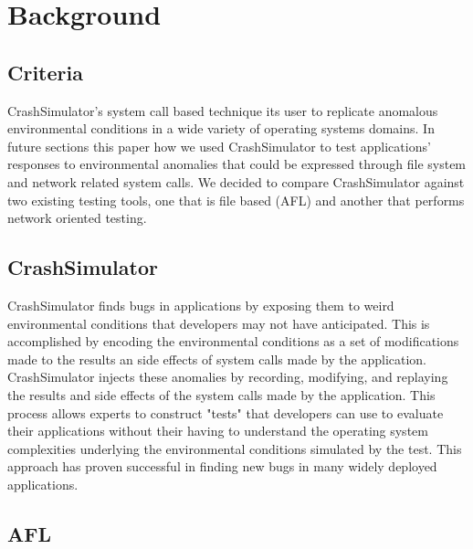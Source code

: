\section{Background}
\label{SEC:background}

\subsection{Criteria}

 CrashSimulator's system call based
technique its user to replicate anomalous environmental conditions in a
wide variety of operating systems domains.  In future sections this paper
how we used CrashSimulator to test applications' responses to environmental
anomalies that could be expressed through file system and network related
system calls.  We decided to compare CrashSimulator against two existing
testing tools, one that is file based (AFL) and another that performs
network oriented testing.

\subsection{CrashSimulator}

CrashSimulator finds bugs in applications by exposing them to weird
environmental conditions that developers may not have anticipated.  This is
accomplished by encoding the environmental conditions as a set of
modifications made to the results an side effects of system calls made by
the application.  CrashSimulator injects these anomalies by recording,
modifying, and replaying the results and side effects of the system calls
made by the application.  This process allows experts to construct "tests"
that developers can use to evaluate their applications without their having
to understand the operating system complexities underlying the
environmental conditions simulated by the test. This approach has proven
successful in finding new bugs in many widely deployed applications.



\subsection{AFL}

